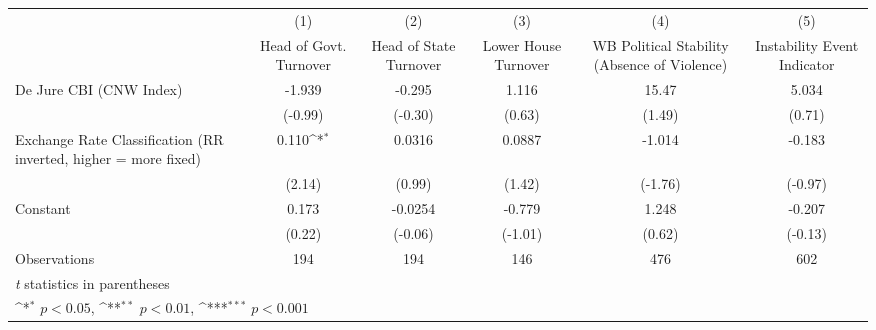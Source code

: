 {
\def\sym#1{\ifmmode^{#1}\else\(^{#1}\)\fi}
\begin{tabular*}{\linewidth}{@{\hskip\tabcolsep\extracolsep\fill}l*{5}{c}}
\toprule
                &\multicolumn{1}{c}{(1)}&\multicolumn{1}{c}{(2)}&\multicolumn{1}{c}{(3)}&\multicolumn{1}{c}{(4)}&\multicolumn{1}{c}{(5)}\\
                &\multicolumn{1}{c}{Head of Govt. Turnover}&\multicolumn{1}{c}{Head of State Turnover}&\multicolumn{1}{c}{Lower House Turnover}&\multicolumn{1}{c}{WB Political Stability (Absence of Violence)}&\multicolumn{1}{c}{Instability Event Indicator}\\
\midrule
De Jure CBI (CNW Index)&   -1.939         &   -0.295         &    1.116         &    15.47         &    5.034         \\
                &  (-0.99)         &  (-0.30)         &   (0.63)         &   (1.49)         &   (0.71)         \\
\addlinespace
Exchange Rate Classification (RR inverted, higher = more fixed)&    0.110\sym{*}  &   0.0316         &   0.0887         &   -1.014         &   -0.183         \\
                &   (2.14)         &   (0.99)         &   (1.42)         &  (-1.76)         &  (-0.97)         \\
\addlinespace
Constant        &    0.173         &  -0.0254         &   -0.779         &    1.248         &   -0.207         \\
                &   (0.22)         &  (-0.06)         &  (-1.01)         &   (0.62)         &  (-0.13)         \\
\midrule
Observations    &      194         &      194         &      146         &      476         &      602         \\
\bottomrule
\multicolumn{6}{l}{\footnotesize \textit{t} statistics in parentheses}\\
\multicolumn{6}{l}{\footnotesize \sym{*} \(p<0.05\), \sym{**} \(p<0.01\), \sym{***} \(p<0.001\)}\\
\end{tabular*}
}
